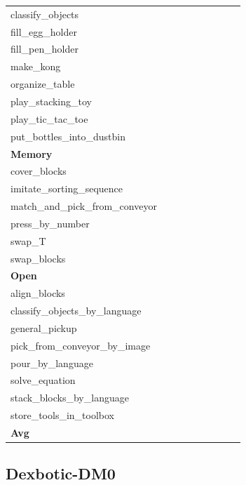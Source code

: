 \begin{table}[H]
{\begin{tabular}{l|c|c|c|c|c|c|c|c}
classify\_objects &  &  &  &  &  &  &  &  \\
fill\_egg\_holder &  &  &  &  &  &  &  &  \\
fill\_pen\_holder &  &  &  &  &  &  &  &  \\
make\_kong &  &  &  &  &  &  &  &  \\
organize\_table &  &  &  &  &  &  &  &  \\
play\_stacking\_toy &  &  &  &  &  &  &  &  \\
play\_tic\_tac\_toe &  &  &  &  &  &  &  &  \\
put\_bottles\_into\_dustbin &  &  &  &  &  &  &  &  \\
\hline
\multicolumn{9}{l}{\textbf{Memory}} \\
cover\_blocks &  &  &  &  &  &  &  &  \\
imitate\_sorting\_sequence &  &  &  &  &  &  &  &  \\
match\_and\_pick\_from\_conveyor &  &  &  &  &  &  &  &  \\
press\_by\_number &  &  &  &  &  &  &  &  \\
swap\_T &  &  &  &  &  &  &  &  \\
swap\_blocks &  &  &  &  &  &  &  &  \\
\hline
\multicolumn{9}{l}{\textbf{Open}} \\
align\_blocks &  &  &  &  &  &  &  &  \\
classify\_objects\_by\_language &  &  &  &  &  &  &  &  \\
general\_pickup &  &  &  &  &  &  &  &  \\
pick\_from\_conveyor\_by\_image &  &  &  &  &  &  &  &  \\
pour\_by\_language &  &  &  &  &  &  &  &  \\
solve\_equation &  &  &  &  &  &  &  &  \\
stack\_blocks\_by\_language &  &  &  &  &  &  &  &  \\
store\_tools\_in\_toolbox &  &  &  &  &  &  &  &  \\
\hline
\textbf{Avg} &  &  &  &  &  &  &  &  \\
\hline
\end{tabular}
}
\end{table}
\subsection{Dexbotic-DM0}
\label{part:dexbotic_dm0}

